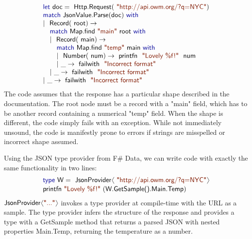 \documentclass[10pt,preprint,blind,clearpagebib]{sigplanconf}
\newcommand{\langl}{\begin{picture}(4.5,7)
\put(1.1,2.5){\rotatebox{60}{\line(1,0){5.5}}}
\put(1.1,2.5){\rotatebox{300}{\line(1,0){5.5}}}
\end{picture}}
\newcommand{\rangl}{\begin{picture}(4.5,7)
\put(.9,2.5){\rotatebox{120}{\line(1,0){5.5}}}
\put(.9,2.5){\rotatebox{240}{\line(1,0){5.5}}}
\end{picture}}
\newcommand{\kvd}[1]{\textnormal{\textcolor{kvdclr}{\sffamily #1}}}
\newcommand{\str}[1]{\textnormal{\textcolor{strclr}{\sffamily "#1"}}}
\newcommand{\ident}[1]{\textnormal{\sffamily #1}}
\begin{document}
\noindent
\begin{equation*}
\begin{array}{l}
 \kvd{let}~\ident{doc}=\ident{Http.Request}(\str{http://api.owm.org/?q=NYC}) \\
 \kvd{match}~\ident{JsonValue.Parse}(\ident{doc})~\kvd{with} \\
 |~\ident{Record}(\ident{root})\rightarrow \\
 \quad \kvd{match}~\ident{Map.find}~\str{main}~\ident{root}~\kvd{with} \\
 \quad |~\ident{Record}(\ident{main})\rightarrow \\
 \quad \quad \kvd{match}~\ident{Map.find}~\str{temp}~\ident{main}~\kvd{with} \\
 \quad \quad |~\ident{Number}(\ident{num})\rightarrow \ident{printfn}~\str{Lovely \%f!}~\ident{num} \\
 \quad \quad |~\_\rightarrow \ident{failwith}~\str{Incorrect format} \\
 \quad |~\_\rightarrow \ident{failwith}~\str{Incorrect format} \\
 |~\_\rightarrow \ident{failwith}~\str{Incorrect format} 
\end{array}
\end{equation*}
%
The code assumes that the response has a particular shape described in the documentation. The
root node must be a record with a \str{main} field, which has to be another record containing
a numerical \str{temp} field. When the shape is different, the code simply fails with an exception. 
While not immediately unsound, the code is manifestly prone to errors if strings are misspelled 
or incorrect shape assumed.

Using the JSON type provider from F\# Data, we can write code with exactly the 
same functionality in two lines:
%
\vspace{-0.1em}
\begin{equation*}
\begin{array}{l}
 \kvd{type}~\ident{W} = \ident{JsonProvider}\langl\str{http://api.owm.org/?q=NYC}\rangl \\[0.1em]
 \ident{printfn}~\str{Lovely \%f!}~(\ident{W.GetSample().Main.Temp})
\end{array}
\end{equation*}
%
$\ident{JsonProvider}\langl\str{...}\rangl$ invokes a type provider \cite{fsharp-typeprov} at 
compile-time with the URL as a sample. The type provider infers the structure of the response
and provides a type with a \ident{GetSample} method that returns a parsed JSON with nested
properties \ident{Main.Temp}, returning the temperature as a number.
\end{document}
